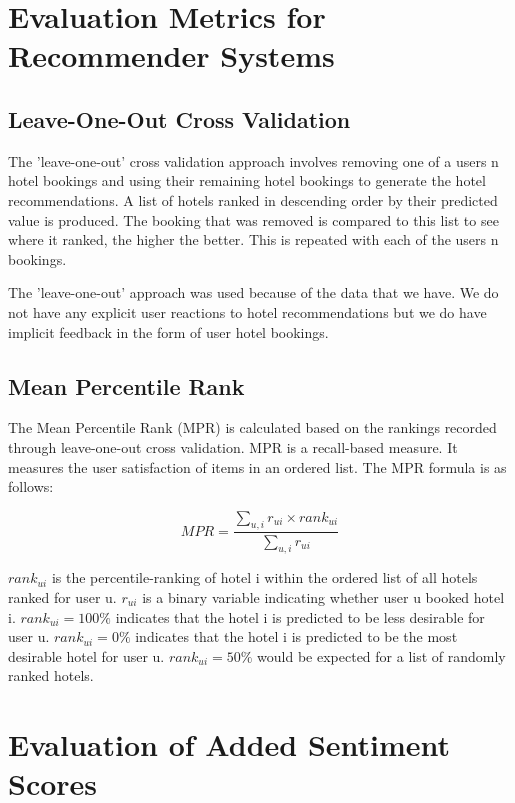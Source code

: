 \section{Evaluation Metrics for Recommender Systems}

\subsection{Leave-One-Out Cross Validation}

The 'leave-one-out' cross validation approach involves removing one of a users n hotel bookings and using their remaining hotel bookings to generate the hotel recommendations. A list of hotels ranked in descending order by their predicted value is produced. The booking that was removed is compared to this list to see where it ranked, the higher the better. This is repeated with each of the users n bookings.

The 'leave-one-out' approach was used because of the data that we have. We do not have any explicit user reactions to hotel recommendations but we do have implicit feedback in the form of user hotel bookings. 

\subsection{Mean Percentile Rank}

The Mean Percentile Rank (MPR) is calculated based on the rankings recorded through leave-one-out cross validation. MPR is a recall-based measure. It measures the user satisfaction of items in an ordered list. The MPR formula is as follows:

\begin{equation}
    MPR = \frac{ \sum_{u,i} r_{ui} \times rank_{ui} } {\sum_{u,i} r_{ui}}
\end{equation}

$rank_{ui}$ is the percentile-ranking of hotel i within the ordered list of all hotels ranked for user u. $r_{ui}$ is a binary variable indicating whether user u booked hotel i. $rank_{ui} = 100\%$ indicates that the hotel i is predicted to be less desirable for user u. $rank_{ui} = 0\%$ indicates that the hotel i is predicted to be the most desirable hotel for user u. $rank_{ui} = 50\%$ would be expected for a list of randomly ranked hotels.

\section{Evaluation of Added Sentiment Scores}

